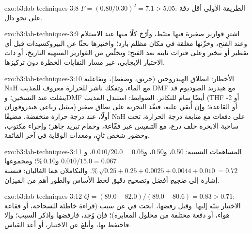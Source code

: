 \begin{solution}{exo:b3:lab-techniques-3:8}
$F = (0.80/0.30)^2 = 7.1 > 5.05$: الطريقة الأولى أقل دقة على نحو دال.
\end{solution}

\begin{solution}{exo:b3:lab-techniques-3:9}
اشترِ قوارير صغيرة فيها مثبّط، وأرّخ كلًا منها عند الاستلام وعند الفتح، وخزّنها
مغلقة في مكان مظلم بارد؛ واختبرها بحثًا عن البيروكسيدات قبل أي تقطير أو تبخير
وعلى فترات ثابتة بعد الفتح؛ وتخلّص من القوارير المنتهية التاريخ، أو
ذات الاختبار الإيجابي، عبر مسار النفايات الخطرة دون تركيزها.
\end{solution}

\begin{solution}{exo:b3:lab-techniques-3:10}
الأخطار: انطلاق الهيدروجين (حريق، وضغط)، وتفاعلية NaH مع الماء،
وتفكك ناشر للحرارة معروف للمذيب DMF مع هيدريد الصوديوم قد ينفلت
عند التسخين؛ وDMF أيضًا سام للتكاثر. الضوابط: استبدل المذيب
(THF أو 2-ميثيل رباعي هيدروفوران) أو القاعدة؛ وإن أُبقي عليه، فنفّذ التجربة على نطاق صغير أولًا، عند درجة حرارة
منخفضة، مضيفًا NaH على دفعات مع متابعة درجة الحرارة، تحت ساحبة الأبخرة
خلف درع، مع التنفيس عبر فقّاعة، وحمام تبريد جاهز؛ وإجراء
مكتوب، وحضور شخص ثانٍ، ومعدات الوقاية في آخر القائمة.
\end{solution}

\begin{solution}{exo:b3:lab-techniques-3:11}
المساهمات النسبية: 0.50، و0.50، و$0.010/20.0 = 0.05$، و$0.010/15.0 = 0.067$ و0.10\,\%؛ ومجموعها
$\sqrt{0.25 + 0.25 + 0.0025 + 0.0044 + 0.010} = 0.72$\,\%. والتكاملان هما الغالبان: فنسبة إشارة إلى ضجيج أفضل
وتصحيح دقيق لخط الأساس والطور أهم من الميزان.
\end{solution}

\begin{solution}{exo:b3:lab-techniques-3:12}
$Q = (89.0 - 82.0)/(89.0 - 80.6) = 0.83 > 0.71$: الاختبار ينبّه إليها. وقبل رفضها، ابحث في 
عن سبب (قراءة خاطئة للسحاحة، أو فقاعة هواء، أو دفعة مختلفة من محلول المعايرة)؛ فإن
وُجد، فارفضها واذكر السبب؛ وإلا فاحتفظ بها، وأبلغ عن الاختبار، أو أعد
القياس.
\end{solution}

